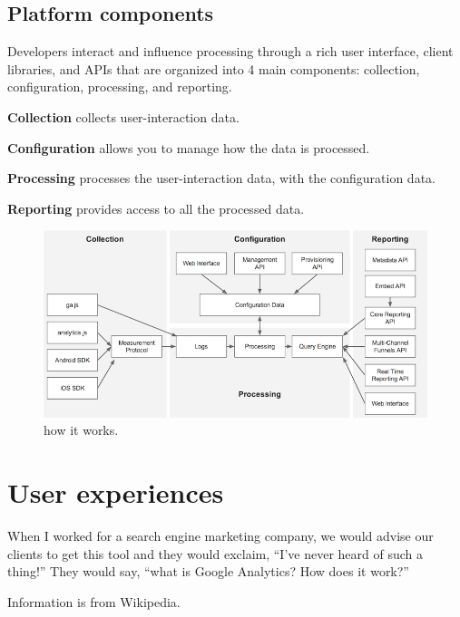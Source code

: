\documentclass {article}
\begin{document}
\subsection {Platform components}
Developers interact and influence processing through a rich user interface, client libraries, and APIs that are organized into 4 main components: collection, configuration, processing, and reporting.


\textbf{Collection}
collects user-interaction data.


\textbf{Configuration}
allows you to manage how the data is processed.


\textbf{Processing}
processes the user-interaction data, with the configuration data.


\textbf{Reporting}
provides access to all the processed data.


\begin {figure}
\centering 
\includegraphics[scale=0.3]{example.png}
\caption {how it works.}
\label {Photo2}
\end {figure}

\section{User experiences}
When I \cite{clifton2012advanced} worked for a search engine marketing company, we would advise our clients to get this tool and they would exclaim, “I’ve never heard of such a thing!” They would say, “what is Google Analytics? How does it work?”

Information is from Wikipedia. \cite{wikipedia}



\end{document}
